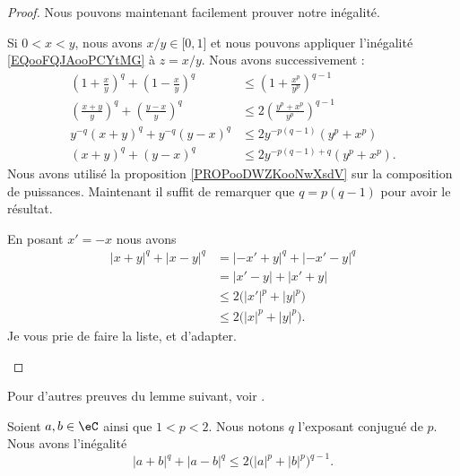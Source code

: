 \begin{proof}
		Nous pouvons maintenant facilement prouver notre inégalité.
		\begin{subproof}
			\spitem[Pour \( 0<x<y\)]
			Si \( 0<x<y\), nous avons \( x/y\in \mathopen[ 0 , 1 \mathclose]\) et nous pouvons appliquer l'inégalité \eqref{EQooFQJAooPCYtMG} à \( z=x/y\). Nous avons successivement :
			\begin{subequations}
				\begin{align}
					\left(1+\frac{ x }{ y }\right)^q+\left( 1-\frac{ x }{ y } \right)^q   & \leq \left( 1+\frac{ x^p }{ y^p } \right)^{q-1}    \\
					\left( \frac{ x+y }{ y } \right)^q+\left( \frac{ y-x }{ y } \right)^q & \leq 2\left( \frac{ y^p+x^p }{ y^p } \right)^{q-1} \\
					y^{-q}(x+y)^q+y^{-q}(y-x)^q                                           & \leq 2y^{-p(q-1)}(y^p+x^p)                         \\
					(x+y)^q+(y-x)^q                                                       & \leq 2y^{-p(q-1)+q}(y^p+x^p).
				\end{align}
			\end{subequations}
			Nous avons utilisé la proposition \ref{PROPooDWZKooNwXsdV} sur la composition de puissances. Maintenant il suffit de remarquer que \( q=p(q-1)\) pour avoir le résultat.

			\spitem[\( x<0\) et \( y>0\)]
			En posant \( x'=-x\) nous avons
			\begin{subequations}
				\begin{align}
					| x+y |^q+| x-y |^q & =| -x'+y |^q+| -x'-y |^q           \\
					                    & =| x'-y |+| x'+y |                 \\
					                    & \leq 2\big( | x' |^p+| y |^p \big) \\
					                    & \leq 2\big( | x |^p+| y |^p \big).
				\end{align}
			\end{subequations}
			Je vous prie de faire la liste, et d'adapter.
		\end{subproof}
	\end{proof}


	Pour d'autres preuves du lemme suivant, voir \cite{BIBooHJQOooJsInho}.
	\begin{lemma}       \label{LEMooLTROooVusGte}
		Soient \( a,b\in \eC\) ainsi que \( 1<p<2\). Nous notons \( q\) l'exposant conjugué de \( p\). Nous avons l'inégalité
		\begin{equation}
			| a+b |^q+| a-b |^q\leq 2\big( | a |^p+| b |^p \big)^{q-1}.
		\end{equation}
	\end{lemma}

